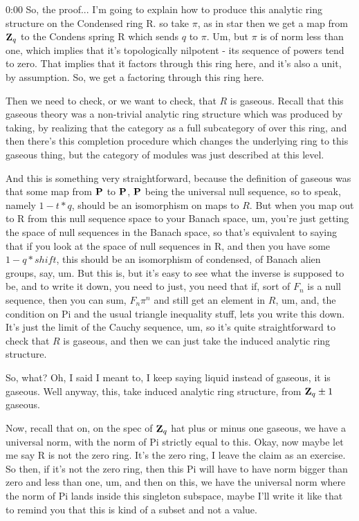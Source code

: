 \begin{unfinished}{0:00}
So, the proof... I'm going to explain how to produce this analytic ring structure on the Condensed ring R. so take $\pi$, as in star then we get a map from $\Z_q$ to the Condens spring R which sends $q$ to $\pi$. Um, but $\pi$ is of norm less than one, which implies that it's topologically nilpotent - its sequence of powers tend to zero. That implies that it factors through this ring here, and it's also a unit, by assumption. So, we get a factoring through this ring here.

Then we need to check, or we want to check, that $R$ is gaseous. Recall that this gaseous theory was a non-trivial analytic ring structure which was produced by taking, by realizing that the category as a full subcategory of over this ring, and then there's this completion procedure which changes the underlying ring to this gaseous thing, but the category of modules was just described at this level.

And this is something very straightforward, because the definition of gaseous was that some map from $\P$ to $\P$, $\P$ being the universal null sequence, so to speak, namely $1 - t * q$, should be an isomorphism on maps to $R$. But when you map out to R from this null sequence space to your Banach space, um, you're just getting the space of null sequences in the Banach space, so that's equivalent to saying that if you look at the space of null sequences in R, and then you have some $1 - q * shift$, this should be an isomorphism of condensed, of Banach alien groups, say, um. But this is, but it's easy to see what the inverse is supposed to be, and to write it down, you need to just, you need that if, sort of $F_n$ is a null sequence, then you can sum, $F_n \pi^n$ and still get an element in $R$, um, and, the condition on Pi and the usual triangle inequality stuff, lets you write this down. It's just the limit of the Cauchy sequence, um, so it's quite straightforward to check that $R$ is gaseous, and then we can just take the induced analytic ring structure.

So, what? Oh, I said I meant to, I keep saying liquid instead of gaseous, it is gaseous. Well anyway, this, take induced analytic ring structure, from $\Z_q \pm 1$ gaseous.

Now, recall that on, on the spec of $\Z_q$ hat plus or minus one gaseous, we have a universal norm, with the norm of Pi strictly equal to this. Okay, now maybe let me say R is not the zero ring. It's the zero ring, I leave the claim as an exercise. So then, if it's not the zero ring, then this Pi will have to have norm bigger than zero and less than one, um, and then on this, we have the universal norm where the norm of Pi lands inside this singleton subspace, maybe I'll write it like that to remind you that this is kind of a subset and not a value.


\end{unfinished}
